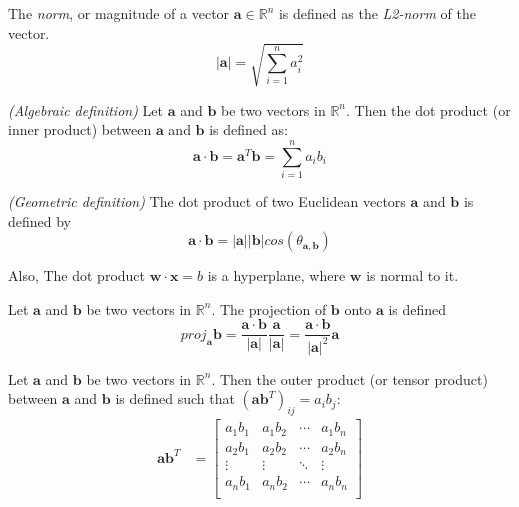 \begin{definition}[Norm]
 The \emph{norm}, or magnitude of a vector $\bm{a}\in\mathbb{R}^n$ is defined as the \emph{L2-norm} of the vector.
 \begin{equation}
     |\bm{a}|=\sqrt{\sum_{i=1}^{n}a_i^2}
 \end{equation}
\end{definition}

\begin{definition}
\emph{(Algebraic definition)} Let $\bm{a}$ and $\bm{b}$ be two vectors in $\mathbb{R}^n$. Then the dot product (or inner product) between $\bm{a}$ and $\bm{b}$ is defined as:
    \begin{equation}
        \bm{a}\cdot\bm{b}=\bm{a}^T\bm{b}=\sum_{i=1}^{n}a_ib_i
    \end{equation}
    
\emph{(Geometric definition)}  The dot product of two Euclidean vectors $\bm{a}$ and $\bm{b}$ is defined by
    \begin{equation}
        \bm{a}\cdot\bm{b}=|\bm{a}||\bm{b}|cos(\theta_{\bm{a},\bm{b}})
    \end{equation}
\end{definition}
Also, The dot product $\bm{w}\cdot\bm{x}=b$ is a hyperplane, where $\bm{w}$ is normal to it.

\begin{definition}[Projection]
  Let $\bm{a}$ and $\bm{b}$ be two vectors in $\mathbb{R}^n$. The projection of $\bm{b}$ onto $\bm{a}$ is defined
  \begin{equation}
proj_{\bm{a}}\bm{b}=\frac{\bm{a}\cdot\bm{b}}{|\bm{a}|}\frac{\bm{a}}{|\bm{a}|}=\frac{\bm{a}\cdot\bm{b}}{|\bm{a}|^2}\bm{a}
  \end{equation}
\end{definition}

\begin{definition}
Let $\bm{a}$ and $\bm{b}$ be two vectors in $\mathbb{R}^n$. Then the outer product (or tensor product) between $\bm{a}$ and $\bm{b}$ is defined such that $(\bm{a}\bm{b}^T)_{ij}=a_ib_j$:
    \begin{align}
        \bm{a}\bm{b}^T&=\begin{bmatrix}
        a_1b_1 & a_1b_2 & \cdots & a_1b_n\\
        a_2b_1 & a_2b_2 & \cdots & a_2b_n\\
        \vdots & \vdots & \ddots & \vdots\\
        a_nb_1 & a_nb_2 & \cdots & a_nb_n\\
        \end{bmatrix}
    \end{align}
\end{definition}


